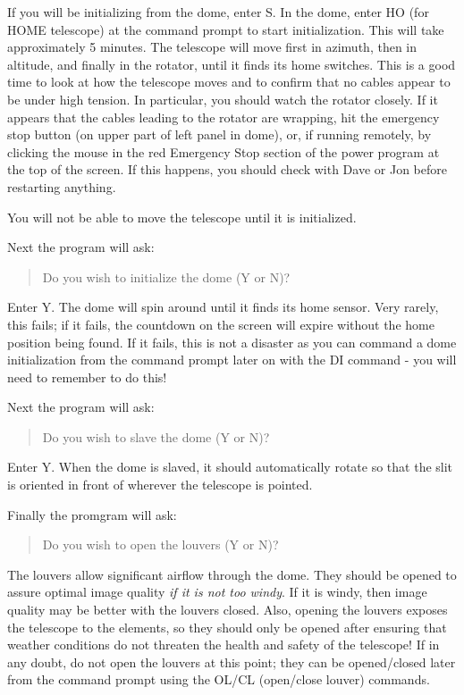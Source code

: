 \documentclass[10pt]{report}
\renewcommand{\[}{\begin{eqnarray}}
\renewcommand{\]}{\end{eqnarray}}
\begin{document}
If you will be initializing from the dome, enter S. In the dome, enter
HO (for HOME telescope) at the command prompt to start initialization.
This will take approximately 5 minutes.
The telescope will move first in azimuth, then in altitude, and finally in
the rotator, until it finds its home switches. This is a good time to
look at how the telescope moves and to confirm that no cables appear to
be under high tension. In particular, you should watch the rotator
closely. If it appears that the cables leading to the rotator are wrapping, 
hit the emergency stop button (on upper part of left panel in dome), or,
if running remotely, by clicking the mouse in the red Emergency Stop section 
of the power program at the top of the screen. If this happens, you should
check with Dave or Jon before restarting anything.

You will not be able to move the telescope until it is initialized.

Next the program will ask:

\begin{quote}
Do you wish to initialize the dome (Y or N)?
\end{quote}

Enter Y. The dome will spin around until it finds its home sensor. Very
rarely, this fails; if it fails, the countdown on the screen will expire
without the home position being found. If it fails, this is not a disaster 
as you can command a dome initialization from the command prompt later on
with the DI command - you will need to remember to do this!

Next the program will ask:

\begin{quote}
Do you wish to slave the dome (Y or N)?
\end{quote}

Enter Y. When the dome is slaved, it should automatically rotate so that
the slit is oriented in front of wherever the telescope is pointed.

Finally the promgram will ask:

\begin{quote}
Do you wish to open the louvers (Y or N)?
\end{quote}

The louvers allow significant airflow through the dome. They should be 
opened to assure optimal image quality \textit{if it is not too windy}.
If it is windy, then image quality may be better with the louvers closed.
Also, opening the louvers exposes the telescope to the elements, so they
should only be opened after ensuring that weather conditions do not
threaten the health and safety of the telescope! If in any doubt, do not
open the louvers at this point; they can be opened/closed later from
the command prompt using the OL/CL (open/close louver) commands.
\end{document}
